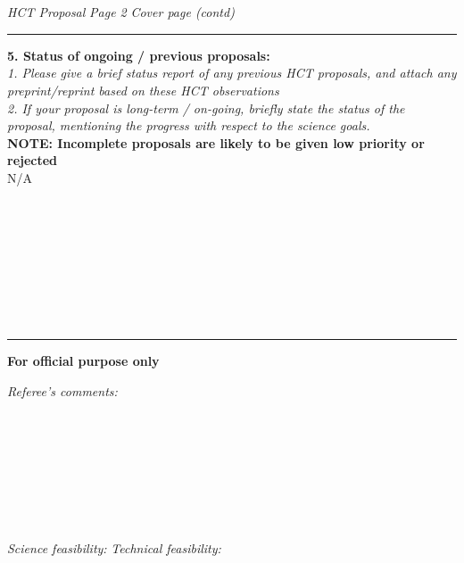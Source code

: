 \documentclass[11pt]{article}
\begin{document}
\\ 
\\
\\
\\
\\
\\
\\
\\
\\
\\
\\
\\

{\it HCT Proposal}\hskip 5cm {\it Page 2} \hfill {\it Cover page (contd)}\\[1mm]
\hrule

{\bf 5. Status of ongoing / previous proposals:}\\ 
{\sl \small {1. Please give a brief status report of any previous HCT proposals, and
attach any preprint/reprint based on these HCT observations\\
2. If your proposal is long-term / on-going, briefly state the status of the
proposal, mentioning the progress with respect to the science goals.}}\\
{\bf \small {NOTE: Incomplete proposals are likely to be given low priority
or rejected}
}
\\
N/A
\\
\\
\\
\\
\\
\\
\\
\\
\\



\hrule
{\bf For official purpose only}

{\it Referee's comments:}\\
\\
\\
\\
\\
\\
\\
\\
\\
{\it Science feasibility:} \hfil {\it Technical feasibility:} \hfil \\
\end{document}
